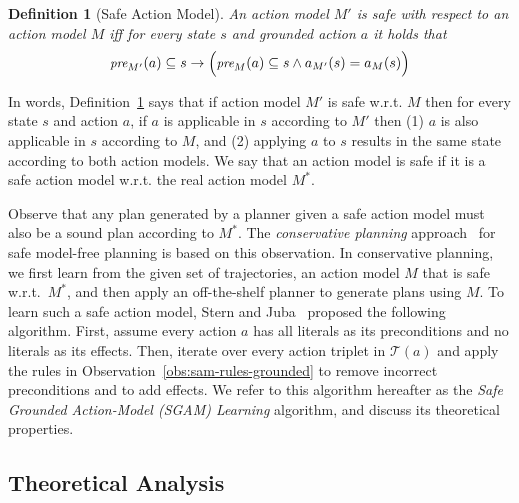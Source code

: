 \documentclass{article}
\newtheorem{definition}{Definition}
\newcommand{\pre}{\textit{pre}}
\newcommand{\realm}{\ensuremath{M^*}\xspace}
\begin{document}
\begin{definition}[Safe Action Model]
\label{def:safe_action_model}
An action model $M'$ is safe with respect to an action model $M$ iff for every state $s$ 
and grounded action $a$ %
it holds that
\begin{equation}
\small
    \pre_{M'}(a)\subseteq s \rightarrow 
    \Big(\pre_M(a)\subseteq s \wedge 
    a_{M'}(s)=a_M(s)\Big)
    \label{eq:safe_action_model}
\end{equation}
\end{definition}
\noindent
In words, Definition~\ref{def:safe_action_model} says that if action model $M'$ is safe w.r.t. $M$ then 
for every state $s$ and action $a$, if $a$ is applicable in $s$ according to $M'$ then
(1) $a$ is also applicable in $s$ according to $M$, 
and (2) applying $a$ to $s$ results in the same state according to both action models. 
We say that an action model is safe if it is a safe action model w.r.t. the real action model \realm. 


Observe that any plan generated by a planner given a safe action model
must also be a sound plan according to \realm. 
The \emph{conservative planning} approach~\cite{stern2017efficientAndSafe} for safe model-free planning is based on this observation. 
In conservative planning, we first learn from the given set of trajectories, an action model $M$ that is safe w.r.t.\ \realm, and then apply an off-the-shelf planner to generate plans using $M$. 
To learn such a safe action model, 
Stern and Juba~ proposed the following algorithm. 
First, assume every action $a$ has all literals as its preconditions and no literals as its effects. 
Then, iterate over every action triplet in $\mathcal{T}(a)$ 
and apply the rules in Observation~\ref{obs:sam-rules-grounded} to remove incorrect preconditions and to add effects. 
We refer to this algorithm hereafter as the \emph{Safe Grounded Action-Model (SGAM) Learning} algorithm, and discuss its theoretical properties. 

\subsection{Theoretical Analysis}
\end{document}
